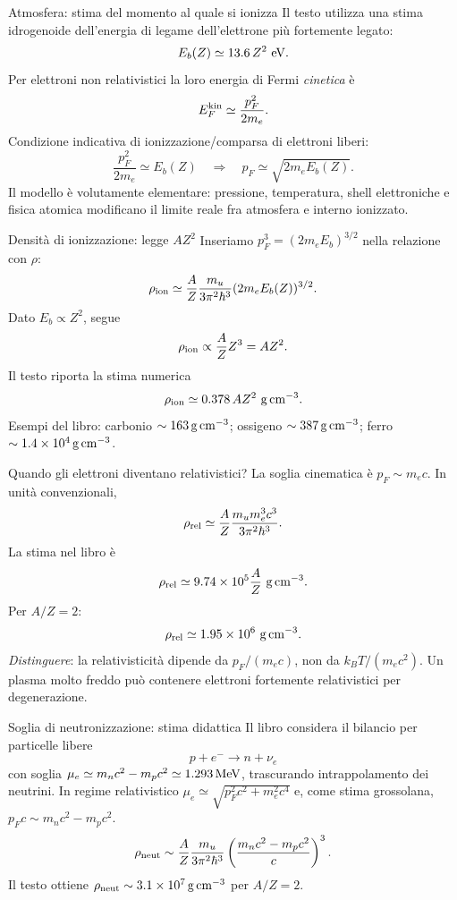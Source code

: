 \begin{frame}[t]{Atmosfera: stima del momento al quale si ionizza}
\small
Il testo utilizza una stima idrogenoide dell'energia di legame dell'elettrone più fortemente legato:
\[
E_b(Z)\simeq13.6\,Z^2\ {\rm eV}.
\]
Per elettroni non relativistici la loro energia di Fermi \emph{cinetica} è
\[
E_F^{\rm kin}\simeq\frac{p_F^2}{2m_e}.
\]
Condizione indicativa di ionizzazione/comparsa di elettroni liberi:
\[
\frac{p_F^2}{2m_e}\simeq E_b(Z)
\quad\Longrightarrow\quad p_F\simeq\sqrt{2m_eE_b(Z)}.
\]
Il modello è volutamente elementare: pressione, temperatura, shell elettroniche e fisica atomica modificano il limite reale fra atmosfera e interno ionizzato.
\end{frame}

\begin{frame}[t]{Densità di ionizzazione: legge $AZ^2$}
\small
Inseriamo $p_F^3=(2m_eE_b)^{3/2}$ nella relazione con $\rho$:
\[
\rho_{\rm ion}\simeq
\frac AZ\frac{m_u}{3\pi^2\hbar^3}
(2m_eE_b(Z))^{3/2}.
\]
Dato $E_b\propto Z^2$, segue
\[
\rho_{\rm ion}\propto \frac AZ Z^3=AZ^2.
\]
Il testo riporta la stima numerica
\[
\rho_{\rm ion}\simeq0.378\,AZ^2\ {\rm g\,cm^{-3}}.
\]
Esempi del libro: carbonio $\sim163\,{\rm g\,cm^{-3}}$; ossigeno $\sim387\,{\rm g\,cm^{-3}}$; ferro $\sim1.4\times10^4\,{\rm g\,cm^{-3}}$.
\end{frame}

\begin{frame}[t]{Quando gli elettroni diventano relativistici?}
\small
La soglia cinematica è $p_F\sim m_ec$. In unità convenzionali,
\[
\rho_{\rm rel}\simeq\frac AZ
\frac{m_um_e^3c^3}{3\pi^2\hbar^3}.
\]
La stima nel libro è
\[
\rho_{\rm rel}\simeq9.74\times10^5\frac AZ
\ {\rm g\,cm^{-3}}.
\]
Per $A/Z=2$:
\[
\rho_{\rm rel}\simeq1.95\times10^6\ {\rm g\,cm^{-3}}.
\]
\emph{Distinguere}: la relativisticità dipende da $p_F/(m_ec)$, non da $k_BT/(m_ec^2)$. Un plasma molto freddo può contenere elettroni fortemente relativistici per degenerazione.
\end{frame}

\begin{frame}[t]{Soglia di neutronizzazione: stima didattica}
\small
Il libro considera il bilancio per particelle libere
\[
p+e^-\rightarrow n+\nu_e
\]
con soglia $\mu_e\simeq m_nc^2-m_pc^2\simeq1.293\,{\rm MeV}$, trascurando intrappolamento dei neutrini.
\medskip
In regime relativistico $\mu_e\simeq\sqrt{p_F^2c^2+m_e^2c^4}$ e, come stima grossolana, $p_Fc\sim m_n c^2-m_p c^2$.
\[
\rho_{\rm neut}\sim\frac AZ\frac{m_u}{3\pi^2\hbar^3}
\left(\frac{m_nc^2-m_pc^2}{c}\right)^3.
\]
Il testo ottiene $\rho_{\rm neut}\sim3.1\times10^7\,{\rm g\,cm^{-3}}$ per $A/Z=2$.
\end{frame}

